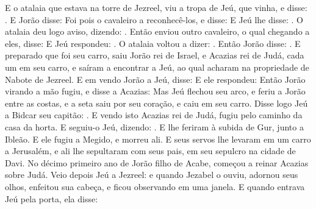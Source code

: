 {  E o atalaia que estava na torre de Jezreel, viu a tropa de Jeú, que vinha, e disse: . E Jorão disse: 
  Foi pois o cavaleiro a reconhecê-los, e disse:  E Jeú lhe disse: . O atalaia deu logo aviso, dizendo: .
  Então enviou outro cavaleiro, o qual chegando a eles, disse:  E Jeú respondeu: .
  O atalaia voltou a dizer: .
  Então Jorão disse: . E preparado que foi seu carro, saiu Jorão rei de Israel, e Acazias rei de Judá, cada um em seu carro, e saíram a encontrar a Jeú, ao qual acharam na propriedade de Nabote de Jezreel.
  E em vendo Jorão a Jeú, disse:  E ele respondeu: 
  Então Jorão virando a mão fugiu, e disse a Acazias: 
  Mas Jeú flechou seu arco, e feriu a Jorão entre as costas, e a seta saiu por seu coração, e caiu em seu carro.
  Disse logo Jeú a Bidcar seu capitão: .
  E vendo isto Acazias rei de Judá, fugiu pelo caminho da casa da horta. E seguiu-o Jeú, dizendo: . E lhe feriram à subida de Gur, junto a Ibleão. E ele fugiu a Megido, e morreu ali. %
  E seus servos lhe levaram em um carro a Jerusalém, e ali lhe sepultaram com seus pais, em seu sepulcro na cidade de Davi.
  No décimo primeiro ano de Jorão filho de Acabe, começou a reinar Acazias sobre Judá.
  Veio depois Jeú a Jezreel: e quando Jezabel o ouviu, adornou seus olhos, enfeitou sua cabeça, e ficou observando em uma janela.
  E quando entrava Jeú pela porta, ela disse: 
}
